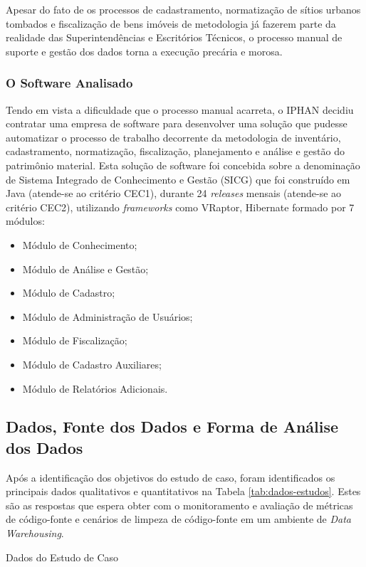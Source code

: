 Apesar do fato de os processos de cadastramento, normatização de sítios urbanos tombados e fiscalização de bens imóveis de metodologia já fazerem parte da realidade das Superintendências e Escritórios Técnicos, o processo manual de suporte e gestão dos dados torna a execução precária e morosa.

\subsubsection{O Software Analisado}

Tendo em vista a dificuldade que o processo manual acarreta, o IPHAN decidiu contratar uma empresa de software para desenvolver uma solução que pudesse automatizar o processo de trabalho decorrente da metodologia de inventário, cadastramento, normatização, fiscalização, planejamento e análise e gestão do patrimônio material. Esta solução de software foi concebida sobre a denominação de Sistema Integrado de Conhecimento e Gestão (SICG) que foi construído em Java (atende-se ao critério CEC1), durante 24 \textit{releases} mensais (atende-se ao critério CEC2), utilizando \textit{frameworks} como VRaptor, Hibernate formado por 7 módulos:

\begin{itemize}
\item Módulo de Conhecimento;
\item Módulo de Análise e Gestão;
\item Módulo de Cadastro;
\item Módulo de Administração de Usuários;
\item Módulo de Fiscalização;
\item Módulo de Cadastro Auxiliares;
\item Módulo de Relatórios Adicionais.
\end{itemize}


\subsection{Dados, Fonte dos Dados e Forma de Análise dos Dados}

Após a identificação dos objetivos do estudo de caso, foram identificados os principais dados qualitativos e quantitativos na Tabela \ref{tab:dados-estudos}. Estes são as respostas que espera obter com o monitoramento e avaliação de métricas de código-fonte e cenários de limpeza de código-fonte em um ambiente de \textit{Data Warehousing}.


\begin{table}[H]
\begin{center}

\caption{Dados do Estudo de Caso}
\label{tab:dados-estudos}
\end{center}
\end{table}
\FloatBarrier

